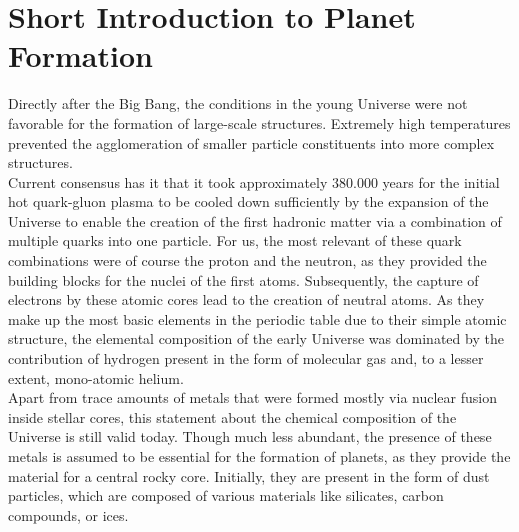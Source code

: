 \section{Short Introduction to Planet Formation}
\label{sec:prerequisites}


    Directly after the Big Bang, the conditions in the young Universe were not favorable for the
    formation of large-scale structures. Extremely high temperatures prevented the agglomeration 
    of smaller particle constituents into more complex structures. \\

    Current consensus has it that it took approximately 380.000 years for
    the initial hot quark-gluon plasma to be cooled down sufficiently by 
    the expansion of the Universe to enable 
    the creation of the first hadronic matter via 
    a combination of multiple quarks into one particle. 
    For us, the most relevant of these quark combinations were of course the proton and the neutron,
    as they provided the building blocks for the nuclei of the first atoms. 
    Subsequently, the capture of electrons by these atomic cores lead to the creation of neutral 
    atoms. As they make up the most basic elements in the periodic table due to their simple 
    atomic structure, 
    the elemental composition of the early Universe was dominated by the contribution 
    of hydrogen present in the form of molecular gas and, to a lesser extent, 
    mono-atomic helium. \\

    Apart from trace amounts of metals that were formed mostly via nuclear fusion inside stellar 
    cores, this statement about the chemical composition of the Universe is still valid today. 
    Though much less abundant, the presence of these metals is assumed to be essential for the 
    formation of planets, as they provide the material for a central rocky core. Initially,
    they are present in the form of dust particles, which are 
    composed of various materials like silicates, carbon compounds, or ices.

